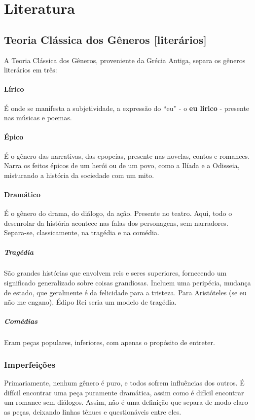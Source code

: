 \documentclass{article}
\begin{document}
\section{Literatura}
\subsection{Teoria Clássica dos Gêneros [literários]}
A Teoria Clássica dos Gêneros, proveniente da Grécia Antiga, separa os gêneros literários em três:

\paragraph{Lírico}
É onde se manifesta a subjetividade, a expressão do ``eu'' - o \textbf{eu lirico} - presente nas músicas e poemas.

\paragraph{Épico}
É o gênero das narrativas, das epopeias, presente nas novelas, contos e romances. Narra os feitos épicos de um herói ou de um povo, como a Ilíada e a Odisseia, misturando a história da sociedade com um mito.

\paragraph{Dramático}
É o gênero do drama, do diálogo, da ação. Presente no teatro. Aqui, todo o desenrolar da história acontece nas falas dos personagens, sem narradores. Separa-se, classicamente, na tragédia e na comédia.
\subparagraph{Tragédia} São grandes histórias que envolvem reis e seres superiores, fornecendo um significado generalizado sobre coisas grandiosas. Incluem uma peripécia, mudança de estado, que geralmente é da felicidade para a tristeza. Para Aristóteles (se eu não me engano), Édipo Rei seria um modelo de tragédia.
\subparagraph{Comédias} Eram peças populares, inferiores, com apenas o propósito de entreter.

\subsubsection{Imperfeições}
Primariamente, nenhum gênero é puro, e todos sofrem influências dos outros. É difícil encontrar uma peça puramente dramática, assim como é difícil encontrar um romance sem diálogos. Assim, não é uma definição que separa de modo claro as peças, deixando linhas tênues e questionáveis entre eles.
\end{document}
